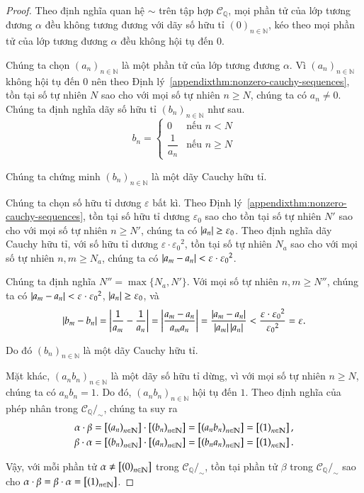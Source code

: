 \begin{proof}
    Theo định nghĩa quan hệ $\sim$ trên tập hợp $\mathscr{C}_{\mathbb{Q}}$, mọi phần tử của lớp tương đương $\alpha$ đều không tương đương với dãy số hữu tỉ ${(0)}_{n\in\mathbb{N}}$, kéo theo mọi phần tử của lớp tương đương $\alpha$ đều không hội tụ đến $0$.

    Chúng ta chọn ${(a_{n})}_{n\in\mathbb{N}}$ là một phần tử của lớp tương đương $\alpha$. Vì ${(a_{n})}_{n\in\mathbb{N}}$ không hội tụ đến $0$ nên theo Định lý~\ref{appendixthm:nonzero-cauchy-sequences}, tồn tại số tự nhiên $N$ sao cho với mọi số tự nhiên $n\geq N$, chúng ta có $a_{n}\ne 0$. Chúng ta định nghĩa dãy số hữu tỉ ${(b_{n})}_{n\in\mathbb{N}}$ như sau.
    \[
        b_{n} = \begin{cases}
            0                & \text{nếu $n < N$}   \\
            \dfrac{1}{a_{n}} & \text{nếu $n\geq N$}
        \end{cases}
    \]

    Chúng ta chứng minh ${(b_{n})}_{n\in\mathbb{N}}$ là một dãy Cauchy hữu tỉ.

    Chúng ta chọn số hữu tỉ dương $\varepsilon$ bất kì. Theo Định lý~\ref{appendixthm:nonzero-cauchy-sequences}, tồn tại số hữu tỉ dương $\varepsilon_{0}$ sao cho tồn tại số tự nhiên $N'$ sao cho với mọi số tự nhiên $n\geq N'$, chúng ta có $\left\vert{a_{n}}\right\vert\geq \varepsilon_{0}$. Theo định nghĩa dãy Cauchy hữu tỉ, với số hữu tỉ dương $\varepsilon\cdot{\varepsilon_{0}}^{2}$, tồn tại số tự nhiên $N_{a}$ sao cho với mọi số tự nhiên $n, m\geq N_{a}$, chúng ta có $\left\vert{a_{m} - a_{n}}\right\vert < \varepsilon\cdot{\varepsilon_{0}}^{2}$.

    Chúng ta định nghĩa $N'' = \max\{ N_{a}, N' \}$. Với mọi số tự nhiên $n, m\geq N''$, chúng ta có $\left\vert{a_{m} - a_{n}}\right\vert < \varepsilon\cdot{\varepsilon_{0}}^{2}$, $\left\vert{a_{n}}\right\vert\geq\varepsilon_{0}$, và
    \[
        \left\vert{b_{m} - b_{n}}\right\vert = \left\vert{\frac{1}{a_{m}} - \frac{1}{a_{n}}}\right\vert = \left\vert{\frac{a_{m} - a_{n}}{a_{m}a_{n}}}\right\vert = \frac{\left\vert{a_{m} - a_{n}}\right\vert}{\left\vert{a_{m}}\right\vert\left\vert{a_{n}}\right\vert} < \frac{\varepsilon\cdot{\varepsilon_{0}}^{2}}{{\varepsilon_{0}}^{2}} = \varepsilon.
    \]

    Do đó ${(b_{n})}_{n\in\mathbb{N}}$ là một dãy Cauchy hữu tỉ.

    Mặt khác, ${(a_{n}b_{n})}_{n\in\mathbb{N}}$ là một dãy số hữu tỉ dừng, vì với mọi số tự nhiên $n\geq N$, chúng ta có $a_{n}b_{n} = 1$. Do đó, ${(a_{n}b_{n})}_{n\in\mathbb{N}}$ hội tụ đến $1$. Theo định nghĩa của phép nhân trong $\mathscr{C}_{\mathbb{Q}}/_{\sim}$, chúng ta suy ra
    \[
        \begin{split}
            \alpha\cdot\beta = \left[{\left({a_{n}}\right)}_{{n}\in\mathbb{N}}\right]\cdot\left[{\left({b_{n}}\right)}_{{n}\in\mathbb{N}}\right] = \left[{\left({a_{n}b_{n}}\right)}_{{n}\in\mathbb{N}}\right] = \left[{\left({1}\right)}_{{n}\in\mathbb{N}}\right], \\
            \beta\cdot\alpha = \left[{\left({b_{n}}\right)}_{{n}\in\mathbb{N}}\right]\cdot\left[{\left({a_{n}}\right)}_{{n}\in\mathbb{N}}\right] = \left[{\left({b_{n}a_{n}}\right)}_{{n}\in\mathbb{N}}\right] = \left[{\left({1}\right)}_{{n}\in\mathbb{N}}\right].
        \end{split}
    \]

    Vậy, với mỗi phần tử $\alpha\ne \left[{\left({0}\right)}_{{n}\in\mathbb{N}}\right]$ trong $\mathscr{C}_{\mathbb{Q}}/_{\sim}$, tồn tại phần tử $\beta$ trong $\mathscr{C}_{\mathbb{Q}}/_{\sim}$ sao cho $\alpha\cdot\beta = \beta\cdot\alpha = \left[{\left({1}\right)}_{{n}\in\mathbb{N}}\right]$.
\end{proof}

